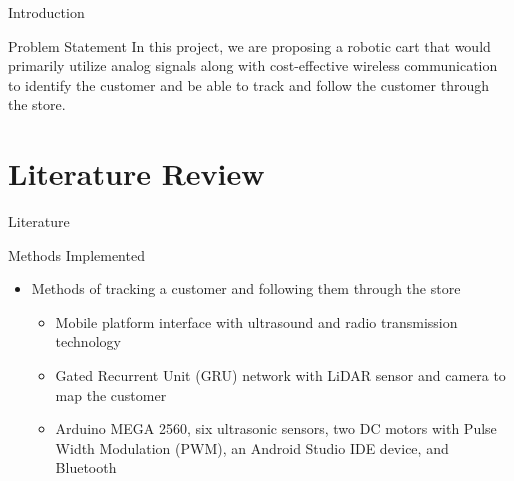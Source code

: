\documentclass{beamer}
\begin{document}

\begin{frame}{Introduction}

  \begin{block}{Problem Statement}
  In this project, we are proposing a robotic cart that would primarily utilize analog signals along with cost-effective wireless communication to identify the customer and be able to track and follow the customer through the store.
  \end{block}
\end{frame}


\section{Literature Review}

\begin{frame}{Literature}
  \begin{block}{Methods Implemented}
    \begin{itemize}
        \item Methods of tracking a customer and following them through the store
            \begin{itemize}
                \item Mobile platform interface with ultrasound and radio transmission technology
                \item Gated Recurrent Unit (GRU) network with LiDAR sensor and camera to map the customer
                \item Arduino MEGA 2560, six ultrasonic sensors, two DC motors with Pulse Width Modulation (PWM), an Android Studio IDE device, and Bluetooth
            \end{itemize}
    \end{itemize}
  \end{block}
\end{frame}
\end{document}
